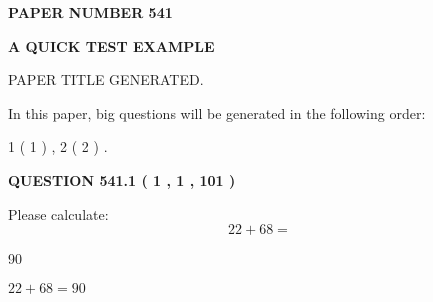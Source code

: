 \documentclass[12pt]{article}
\begin{document}
   
   
   
\newpage 
\setcounter{page}{ 
   541001 } 
   
   
   
   
 {\textbf{ \Large{ PAPER NUMBER  541  }}}
   
   
\vspace{0.2in}
   
   
   
   
   
   
   
   
 \vspace{0.2in}
{\LARGE {\textbf{ A QUICK TEST EXAMPLE}}}
   
   
 PAPER TITLE GENERATED.
   
   
   
\vspace{0.2in}
   
In this paper, big questions will be generated in the following order: 
   
   
   1 ( 1 )
 ,
   2 ( 2 )
 .
  
\vspace{0.2in}
  
{\textbf{\Large{QUESTION
541.1 
 ( 1 , 1 , 101 )
}}}
  
  
 
Please calculate:
\begin{equation}
22 +  %
68 = \nonumber
\end{equation}
 
 
 
\noindent{}
 
 

90
 
 
\noindent{}
 
 

 
 
 
\noindent{}
 
 

$ %
22 +  %
68=   %
90$
 
 
\noindent{}
 
 

 
   
\end{document}
